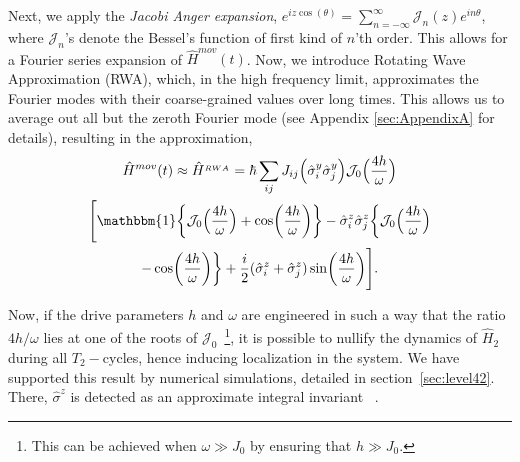 \documentclass[%
nofootinbib,
reprint,
superscriptaddress,
amsmath,amssymb,showkeys,
aps,
prb,
]{revtex4-2}
\begin{document}
		

	Next, we apply the \textit{Jacobi Anger expansion}, $\displaystyle e^{iz \cos(\theta)} = \sum_{n=-\infty}^{\infty} \mathcal{J}_n(z) e^{in\theta}$, where $\mathcal{J}_n$'s denote the  Bessel's function of first kind of $n$'th order. This allows for a Fourier series expansion of $\hat{H}^{mov}(t)$. Now, we introduce Rotating Wave Approximation (RWA), which, in the high frequency limit, approximates the Fourier modes with their coarse-grained values over long times. This allows us to average out all but the zeroth Fourier mode (see Appendix \ref{sec:AppendixA} for details), resulting in the approximation,
		\begin{multline}
			\hat{H}^{mov}(t)\approx \hat{H}^{_{RWA}} = \hbar\sum_{ij} J_{ij} \Big(\hat{\sigma}^y_i\hat{\sigma}^y_j\Big) \mathcal{J}_0\Big(\frac{4h}{\omega}\Big)\\
			\Bigg[\mathbbm{1}\bigg\{\mathcal{J}_0\Big(\frac{4h}{\omega}\Big) + \cos(\frac{4h}{\omega})\bigg\}-\hat{\sigma}^z_i\hat{\sigma}^z_j \bigg\{\mathcal{J}_0\Big(\frac{4h}{\omega}\Big)\\
			- \cos(\frac{4h}{\omega})\bigg\} + \frac{i}{2} (\hat{\sigma}^z_i + \hat{\sigma}^z_j) \sin(\frac{4h}{\omega})\Bigg].
			\label{eq:movham1}
	\end{multline}

	Now, if the drive parameters $h$ and $\omega$  are {engineered} in such a way that the ratio ${4h}/{\omega}$ lies at one of the roots of $\mathcal{J}_0$~\footnote{This can be achieved when $\omega \gg J_0$ by ensuring that $h\gg J_0$.}, it is possible to nullify the dynamics of $\hat{H}_2$ during all $T_2-$cycles, hence inducing localization in the system. We have supported this result by numerical simulations, detailed in section~\ref{sec:level42}. There, $\hat{\sigma}^z$ is detected as an approximate integral invariant ~\cite{Keser2016,Dodonov1978}. 
	
\end{document}
